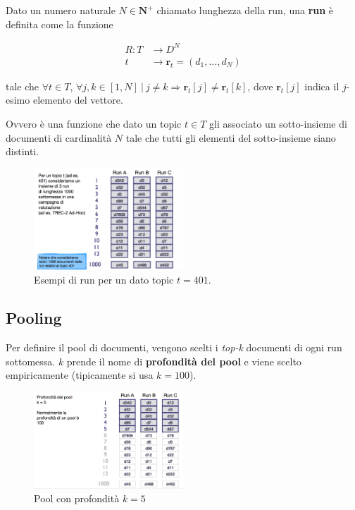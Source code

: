 Dato un numero naturale $N \in \mathbf{N}^+$ chiamato lunghezza della run, una \textbf{run} è definita come la funzione

\begin{align*}
R : T &\to D^N \\
	t &\to \mathbf{r}_t = (d_1, \ldots, d_N)
\end{align*}

\noindent tale che $\forall t \in T$, $\forall j,k \in [1,N] \ | \ j \neq k \Rightarrow \mathbf{r}_t[j] \neq  \mathbf{r}_t[k]$, dove $ \mathbf{r}_t[j]$ indica il $j$-esimo elemento del vettore.

Ovvero è una funzione che dato un topic $t \in T$ gli associato un sotto-insieme di documenti di cardinalità $N$ tale che tutti gli elementi del sotto-insieme siano distinti.

\begin{figure}[htbp]
	\centering
	\includegraphics[width=0.5\textwidth]{images/l14-fig-1.png}
	\caption{Esempi di run per un dato topic $t = 401$.}
\end{figure}


\subsection{Pooling}

Per definire il pool di documenti, vengono scelti i \textit{top-k} documenti di ogni run sottomessa. $k$ prende il nome di \textbf{profondità del pool} e viene scelto empiricamente (tipicamente si usa $k =100$).

\begin{figure}[htbp]
	\centering
	\includegraphics[width=0.5\textwidth]{images/l14-fig-2.png}
	\caption{Pool con profondità $k=5$}
\end{figure}

